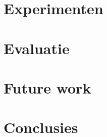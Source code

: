 \documentclass[master=cws,masteroption=gs]{kulemt}
\begin{document}
\begin{preface}
\end{preface}

\tableofcontents

\begin{abstract}
\end{abstract}


\mainmatter






\chapter{Experimenten}
\chapter{Evaluatie}
\chapter{Future work}
\chapter{Conclusies}



\end{document}
